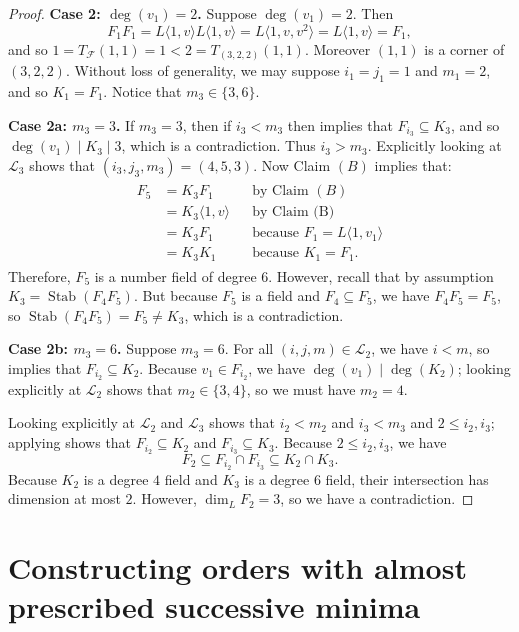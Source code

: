 \documentclass[letterpaper,10pt]{amsart}
\DeclareMathOperator{\Stab}{Stab}
\newcommand{\cF}{\mathcal{F}}
\newcommand{\cL}{\mathcal{L}}
\theoremstyle{definition}
\theoremstyle{remark}
\begin{document}
\begin{proof}
\noindent \textbf{Case 2: $\deg(v_1) = 2$.}
Suppose $\deg(v_1) = 2$. Then
\[
F_1F_1 = L\langle 1,v\rangle L\langle 1,v\rangle = L\langle 1,v,v^2 \rangle = L\langle 1,v\rangle= F_1,
\]
and so $1 = T_{\cF}(1,1) = 1 < 2 = T_{(3,2,2)}(1,1)$. Moreover $(1,1)$ is a corner of $(3,2,2)$. Without loss of generality, we may suppose $i_1 = j_1 = 1$ and $m_1 = 2$, and so $K_1 = F_1$. Notice that $m_3 \in \{3,6\}$.

\noindent \textbf{Case 2a: $m_3 = 3$.} If $m_3 = 3$, then if $i_3 < m_3$ then  implies that $F_{i_3} \subseteq K_{3}$, and so $\deg(v_1) \mid K_{3} \mid 3$, which is a contradiction. Thus $i_3 > m_3$. Explicitly looking at $\cL_3$ shows that $(i_3,j_3,m_3) = (4,5,3)$. Now Claim $(B)$ implies that:
\begin{gather}
\begin{aligned}
F_{5} &= K_3F_{1} && \text{by Claim $(B)$} \\
&= K_3\langle 1,v\rangle && \text{by Claim (B)} \\
&= K_3 F_1 && \text{because $F_1 =  L\langle 1,v_1\rangle$} \\
&= K_3 K_1 && \text{because $K_1 = F_1$}.
\end{aligned}
\end{gather}
Therefore, $F_5$ is a number field of degree $6$. However, recall that by assumption $K_3 = \Stab(F_4F_5)$. But because $F_5$ is a field and $F_4 \subseteq F_5$, we have $F_4F_5 = F_5$, so $\Stab(F_4F_5) = F_5 \neq K_3$, which is a contradiction.

\noindent \textbf{Case 2b: $m_3 = 6$.}
Suppose $m_3 = 6$. For all $(i,j,m) \in \cL_2$, we have $i < m$, so  implies that $F_{i_2} \subseteq K_{2}$. Because $v_1 \in F_{i_2}$, we have $\deg(v_1) \mid \deg(K_2)$; looking explicitly at $\cL_2$ shows that $m_2 \in \{3,4\}$, so we must have $m_2 = 4$.

Looking explicitly at $\cL_2$ and $\cL_3$ shows that $i_2 < m_2$ and $i_3 < m_3$ and $2 \leq i_2,i_3$; applying  shows that $F_{i_2} \subseteq K_2$ and $F_{i_3} \subseteq K_3$. Because  $2 \leq i_2,i_3$, we have
\[
    F_2 \subseteq F_{i_2}\cap F_{i_3} \subseteq K_2 \cap K_3.
\]
Because $K_2$ is a degree $4$ field and $K_3$ is a degree $6$ field, their intersection has dimension at most $2$. However, $\dim_{ L}F_2 = 3$, so we have a contradiction.
\end{proof}

\section{Constructing orders with almost prescribed successive minima}
\label{sec:construction}
\end{document}
